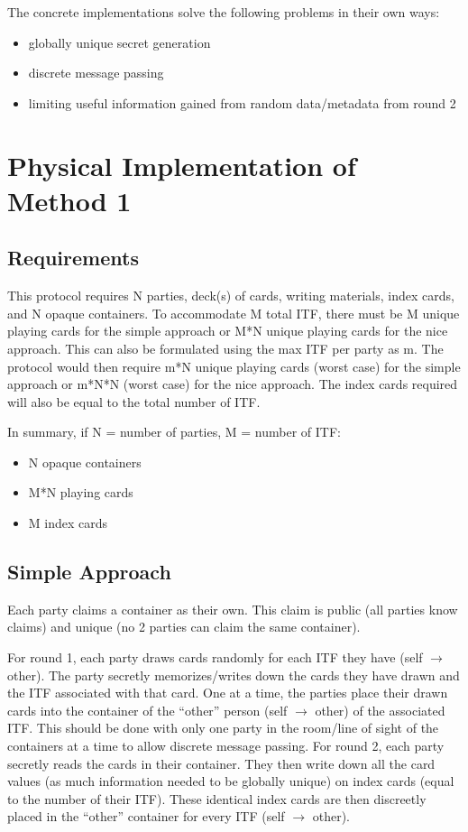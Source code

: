\documentclass[conference]{IEEEtran}
\begin{document}
The concrete implementations solve the following problems in their own ways:
\begin{itemize}
\item globally unique secret generation
\item discrete message passing
\item limiting useful information gained from random data/metadata from round 2
\end{itemize}

\section{Physical Implementation of Method 1}

\subsection{Requirements}\label{AA}
This protocol requires N parties, deck(s) of cards, writing materials, index cards, and N opaque containers. To accommodate M total ITF, there must be M unique playing cards for the simple approach or M*N unique playing cards for the nice approach. This can also be formulated using the max ITF per party as m. The protocol would then require m*N unique playing cards (worst case) for the simple approach or m*N*N (worst case) for the nice approach. The index cards required will also be equal to the total number of ITF.

In summary, if N = number of parties, M = number of ITF:
\begin{itemize}
\item N opaque containers
\item M*N playing cards
\item M index cards
\end{itemize}

\subsection{Simple Approach}
Each party claims a container as their own. This claim is public (all parties know claims) and unique (no 2 parties can claim the same container).

For round 1, each party draws cards randomly for each ITF they have (self $\rightarrow$ other). The party secretly memorizes/writes down the cards they have drawn and the ITF associated with that card. One at a time, the parties place their drawn cards into the container of the “other” person (self $\rightarrow$ other) of the associated ITF. This should be done with only one party in the room/line of sight of the containers at a time to allow discrete message passing.
For round 2, each party secretly reads the cards in their container. They then write down all the card values (as much information needed to be globally unique) on index cards (equal to the number of their ITF). These identical index cards are then discreetly placed in the “other” container for every ITF (self $\rightarrow$ other).
\end{document}
